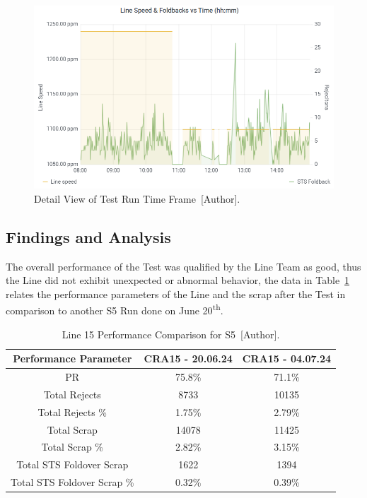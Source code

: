 \begin{figure}[H]
    \centering
    \includegraphics[width=1\linewidth, height = 0.4\textheight]{FIGURES/L15_22.png}
    \caption{Detail View of Test Run Time Frame~[Author].}
    \label{L152}
\end{figure}
\subsection{Findings and Analysis}

The overall performance of the Test was qualified by the Line Team as good, thus the Line did not exhibit unexpected or abnormal behavior, the data in Table~\ref{PR15} relates the performance parameters of the Line and the scrap after the Test in comparison to another S5 Run done on June 20\textsuperscript{th}.

\begin{table}[H]
\centering
\scriptsize
\begin{tabular}{ccc}
\hline
\textbf{Performance Parameter}          & \textbf{CRA15 - 20.06.24} & \textbf{CRA15 - 04.07.24} \\ \hline
PR                             & 75.8\%           & 71.1\%          \\
Total Rejects                  & 8733             & 10135           \\
Total Rejects \%              & 1.75\%           & 2.79\%          \\
Total Scrap                    & 14078            & 11425           \\
Total Scrap \%                & 2.82\%           & 3.15\%          \\
Total STS Foldover Scrap     & 1622             & 1394            \\
Total STS Foldover Scrap \% & 0.32\%           & 0.39\%          \\ \hline
\end{tabular}%
\caption{Line 15 Performance Comparison for S5~[Author].}
\label{PR15}
\end{table}

